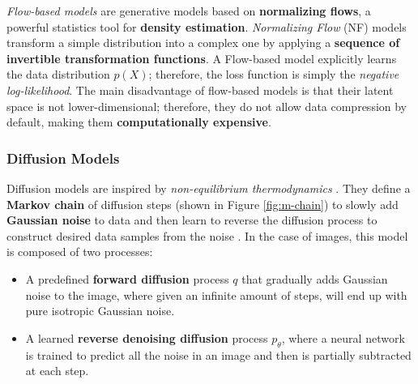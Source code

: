 \documentclass[preprint]{elsarticle}
\begin{document}
\emph{Flow-based models} \cite{weng2018flow} are generative models based on \textbf{normalizing flows}, a powerful statistics tool for \textbf{density estimation}.
\emph{Normalizing Flow} (NF) \cite{rezende2016variational} models transform a simple distribution into a complex one by applying a \textbf{sequence of invertible transformation functions}. 
A Flow-based model explicitly learns the data distribution $p(X)$; therefore, the loss function is simply the \emph{negative log-likelihood}.
The main disadvantage of flow-based models is that their latent space is not lower-dimensional; 
therefore, they do not allow data compression by default, making them \textbf{computationally expensive}.


\subsubsection{Diffusion Models} \label{sec:diff}



Diffusion models are inspired by \emph{non-equilibrium thermodynamics} \cite{V_n_2020}. 
They define a \textbf{Markov chain} of diffusion steps (shown in Figure \ref{fig:m-chain}) to slowly 
add \textbf{Gaussian noise} to data and then learn to reverse the diffusion process to construct desired data samples from the noise \cite{weng2021diffusion}. 
In the case of images, this model is composed of two processes:
\begin{itemize}
	\item A predefined \textbf{forward diffusion} process $q$ that gradually adds Gaussian noise to the image, where given an infinite amount of steps, will end up with pure isotropic Gaussian noise. 
	\item A learned \textbf{reverse denoising diffusion} process $p_\theta$, where a neural network is trained to predict all the noise in an image and then is partially subtracted at each step.
\end{itemize}
\end{document}
